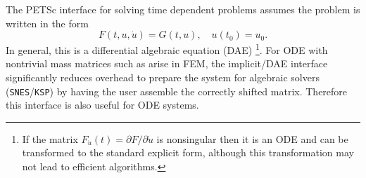 \vspace{.2cm}

The PETSc interface for solving time dependent problems assumes the problem is written in the form
\[
        F(t,u,\dot{u}) = G(t,u), \quad u(t_0) = u_0.
\]
In general, this is a differential algebraic
equation (DAE) \footnote{If the matrix $F_{\dot{u}}(t) = \partial F
/ \partial \dot{u}$ is nonsingular then it is an ODE and can be
transformed to the standard explicit form, although this transformation
may not lead to efficient algorithms.}.
For ODE with nontrivial mass matrices such as arise in FEM, the implicit/DAE interface significantly
reduces overhead to prepare the system for algebraic solvers (\lstinline{SNES}/\lstinline{KSP})
by having the user assemble the correctly shifted matrix.  Therefore
this interface is also useful for ODE systems.

